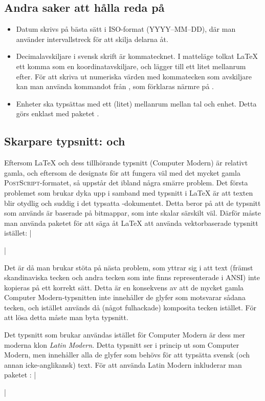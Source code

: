 \documentclass[10pt,../../a4.tex]{subfiles}
\begin{document}
\subsection{Andra saker att hålla reda på}
\begin{itemize}
\item Datum skrivs på bästa sätt i ISO-format (YYYY–MM–DD), där man
	använder intervallstreck för att skilja delarna åt.
	
\item Decimalavskiljare i svensk skrift är kommatecknet. I matteläge
	tolkat \LaTeX{} ett komma som en koordinatavskiljare, och lägger
	till ett litet mellanrum efter. För att skriva ut numeriska värden
	med kommatecken som avskiljare kan man använda kommandot 
	från , som förklaras närmre på .
	
\item Enheter ska typsättas med ett (litet) mellanrum mellan tal och
	enhet. Detta görs enklast med paketet .
\end{itemize}

\subsection{Skarpare typsnitt:  och }
\label{sec:2:lmodern}
Eftersom \LaTeX{} och dess tillhörande typsnitt (Computer Modern) är
relativt gamla, och eftersom de designats för att fungera väl med det
mycket gamla \textsc{PostScript}-formatet, så uppstår det ibland några
smärre problem. Det första problemet som brukar dyka upp i samband med
typsnitt i \LaTeX{} är att texten blir otydlig och suddig i det typsatta
\PDF-dokumentet. Detta beror på att de typsnitt som används är baserade
på bitmappar, som inte skalar särskilt väl. Därför måste man använda
paketet  för att säga åt \LaTeX{} att använda vektorbaserade
typsnitt istället:
\latex|\usepackage[T1]{fontenc}|

Det är då man brukar stöta på nästa problem, som yttrar sig i att text
(främst skandinaviska tecken och andra tecken som inte finns 
representerade i \textsc{ANSI}) inte kopieras på ett korrekt sätt. Detta
är en konsekvens av att de mycket gamla Computer Modern-typsnitten inte
innehåller de glyfer som motsvarar sådana tecken, och istället används då
(något fulhackade) komposita tecken istället. För att lösa detta måste man
byta typsnitt.

Det typsnitt som brukar användas istället för Computer Modern är dess
mer moderna klon \emph{Latin Modern}. Detta typsnitt ser
i princip ut som Computer Modern, men innehåller alla de glyfer som behövs
för att typsätta svensk (och annan icke-anglikansk) text. För att använda
Latin Modern inkluderar man paketet :
\latex|\usepackage{lmodern}|
\end{document}

